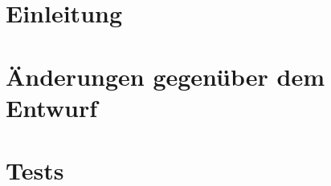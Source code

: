

	\maketitle
	\setcounter{tocdepth}{1}
	\tableofcontents

	\chapter{Einleitung}
			
	\chapter{Änderungen gegenüber dem Entwurf}
	\label{chap:aenderungf}
		
	\chapter{Tests}
	\label{chap:test}
		

